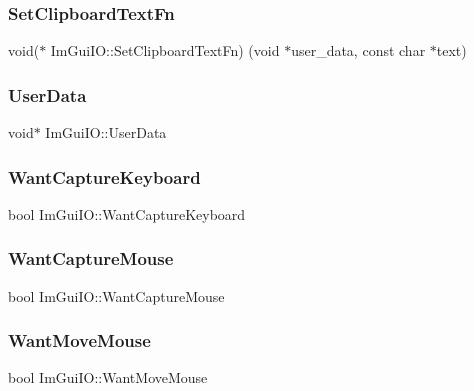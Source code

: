 \subsubsection{\texorpdfstring{Set\+Clipboard\+Text\+Fn}{SetClipboardTextFn}}
{\footnotesize\ttfamily void($\ast$ Im\+Gui\+I\+O\+::\+Set\+Clipboard\+Text\+Fn) (void $\ast$user\+\_\+data, const char $\ast$text)}

\hypertarget{struct_im_gui_i_o_a8c5e74fd39c2655455329e09529da7d3}{}\label{struct_im_gui_i_o_a8c5e74fd39c2655455329e09529da7d3} 
\subsubsection{\texorpdfstring{User\+Data}{UserData}}
{\footnotesize\ttfamily void$\ast$ Im\+Gui\+I\+O\+::\+User\+Data}

\hypertarget{struct_im_gui_i_o_a458e4ca98d896adb16e3a41ec6d2b811}{}\label{struct_im_gui_i_o_a458e4ca98d896adb16e3a41ec6d2b811} 
\subsubsection{\texorpdfstring{Want\+Capture\+Keyboard}{WantCaptureKeyboard}}
{\footnotesize\ttfamily bool Im\+Gui\+I\+O\+::\+Want\+Capture\+Keyboard}

\hypertarget{struct_im_gui_i_o_af5b8add76c5d833a65df19b5456acd7e}{}\label{struct_im_gui_i_o_af5b8add76c5d833a65df19b5456acd7e} 
\subsubsection{\texorpdfstring{Want\+Capture\+Mouse}{WantCaptureMouse}}
{\footnotesize\ttfamily bool Im\+Gui\+I\+O\+::\+Want\+Capture\+Mouse}

\hypertarget{struct_im_gui_i_o_a0bd366ca18e78bf58f674a355189eaf3}{}\label{struct_im_gui_i_o_a0bd366ca18e78bf58f674a355189eaf3} 
\subsubsection{\texorpdfstring{Want\+Move\+Mouse}{WantMoveMouse}}
{\footnotesize\ttfamily bool Im\+Gui\+I\+O\+::\+Want\+Move\+Mouse}

